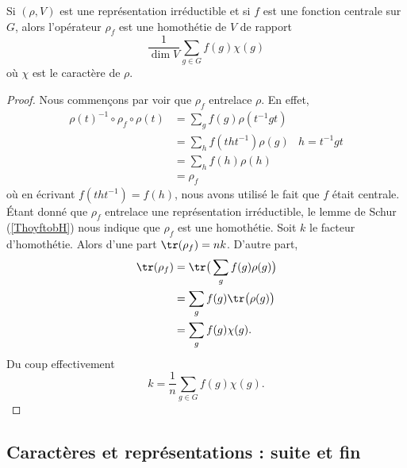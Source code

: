 \begin{proposition}  \label{PropEAXkAY}
	Si \( (\rho,V)\) est une représentation irréductible et si \( f\) est une fonction centrale sur \( G\), alors l'opérateur \( \rho_f\) est une homothétie de \( V\) de rapport
	\begin{equation}
		\frac{1}{ \dim V }\sum_{g\in G}f(g)\chi(g)
	\end{equation}
	où \( \chi\) est le caractère de \( \rho\).
\end{proposition}

\begin{proof}
	Nous commençons par voir que \( \rho_f\) entrelace \( \rho\). En effet,
	\begin{subequations}
		\begin{align}
			\rho(t)^{-1}\circ\rho_f\circ\rho(t) & =\sum_gf(g)\rho(t^{-1}gt)              \\
			                                    & =\sum_hf(tht^{-1})\rho(g) & h=t^{-1}gt \\
			                                    & =\sum_hf(h)\rho(h)                     \\
			                                    & =\rho_f
		\end{align}
	\end{subequations}
	où en écrivant \( f(tht^{-1})=f(h)\), nous avons utilisé le fait que \( f\) était centrale. Étant donné que \( \rho_f\) entrelace une représentation irréductible, le lemme de Schur (\ref{ThoyftobH}) nous indique que \( \rho_f\) est une homothétie. Soit \( k\) le facteur d'homothétie. Alors d'une part \( \tr(\rho_f)=nk\). D'autre part,
	\begin{subequations}
		\begin{align}
			\tr(\rho_f) & =\tr\big( \sum_gf(g)\rho(g) \big) \\
			            & =\sum_gf(g)\tr\big( \rho(g) \big) \\
			            & =\sum_gf(g)\chi(g).
		\end{align}
	\end{subequations}
	Du coup effectivement
	\begin{equation}
		k=\frac{1}{ n }\sum_{g\in G}f(g)\chi(g).
	\end{equation}
\end{proof}

\subsection{Caractères et représentations : suite et fin}

